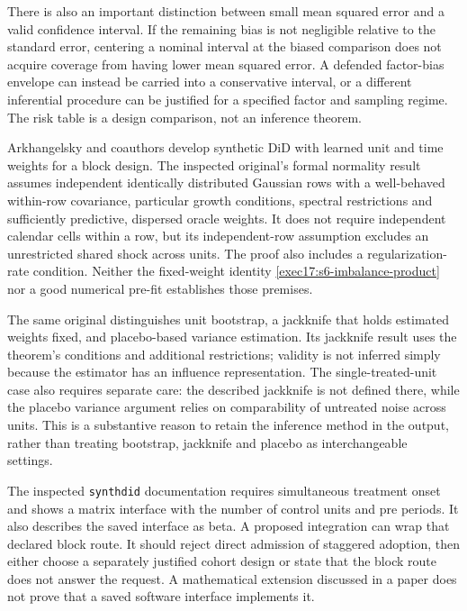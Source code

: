There is also an important distinction between small mean squared error
and a valid confidence interval. If the remaining bias is not negligible
relative to the standard error, centering a nominal interval at the biased
comparison does not acquire coverage from having lower mean squared error.
A defended factor-bias envelope can instead be carried into a conservative
interval, or a different inferential procedure can be justified for a
specified factor and sampling regime. The risk table is a design
comparison, not an inference theorem.

Arkhangelsky and coauthors develop synthetic DiD with learned unit and
time weights for a block design. The inspected original's formal
normality result assumes independent identically distributed Gaussian
rows with a well-behaved within-row covariance, particular growth
conditions, spectral restrictions and sufficiently predictive, dispersed
oracle weights. It does not require independent calendar cells within a
row, but its independent-row assumption excludes an unrestricted shared
shock across units. The proof also includes a regularization-rate
condition. Neither the fixed-weight identity
\eqref{exec17:s6-imbalance-product} nor a good numerical pre-fit
establishes those premises.~\citep{synthdid2021}

The same original distinguishes unit bootstrap, a jackknife that holds
estimated weights fixed, and placebo-based variance estimation. Its
jackknife result uses the theorem's conditions and additional restrictions;
validity is not inferred simply because the estimator has an influence
representation. The single-treated-unit case also requires separate care:
the described jackknife is not defined there, while the placebo
variance argument relies on comparability of untreated noise across
units. This is a substantive reason to retain the inference method in
the output, rather than treating bootstrap, jackknife and placebo as
interchangeable settings.~\citep{synthdid2021}

The inspected \texttt{synthdid} documentation requires simultaneous
treatment onset and shows a matrix interface with the number of control
units and pre periods. It also describes the saved interface as beta.
A proposed integration can wrap that declared block route. It should
reject direct admission of staggered adoption, then either choose a
separately justified cohort design or state that the block route does not
answer the request. A mathematical extension discussed in a paper does
not prove that a saved software interface implements it.~\citep{sw_synthdid}

